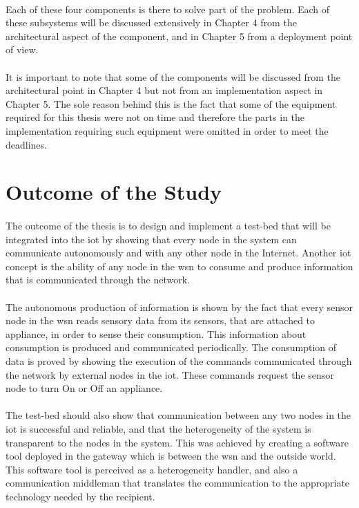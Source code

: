 \documentclass[oneside,12pt,a4paper,final]{book}
\begin{document}
\paragraph{}
Each of these four components is there to solve part of the problem. Each of these subsystems will be discussed extensively in Chapter 4 from the architectural aspect of the component, and in Chapter 5 from a deployment point of view. 
\paragraph{}
It is important to note that some of the components will be discussed from the architectural point in Chapter 4 but not from an implementation aspect in Chapter 5. The sole reason behind this is the fact that some of the equipment required for this thesis were not on time and therefore the parts in the implementation requiring such equipment were omitted in order to meet the deadlines.
\section{Outcome of the Study}
\paragraph{}
The outcome of the thesis is to design and implement a test-bed that will be integrated into the \gls{iot} by showing that every node in the system can communicate autonomously and with any other node in the Internet. Another \gls{iot} concept is the ability of any node in the \gls{wsn} to consume and produce information that is communicated through the network.
\paragraph{}
The autonomous production of information is shown by the fact that every sensor node in the \gls{wsn} reads sensory data from its sensors, that are attached to appliance, in order to sense their consumption. This information about consumption is produced and communicated periodically. The consumption of data is proved by showing the execution of the commands communicated through the network by external nodes in the \gls{iot}. These commands request the sensor node to turn On or Off an appliance.
\paragraph{}
The test-bed should also show that communication between any two nodes in the \gls{iot} is successful and reliable, and that the heterogeneity of the system is transparent to the nodes in the system. This was achieved by creating a software tool deployed in the gateway which is between the \gls{wsn} and the outside world. This software tool is perceived as a heterogeneity handler, and also a communication middleman that translates the communication to the appropriate technology needed by the recipient.
\end{document}
